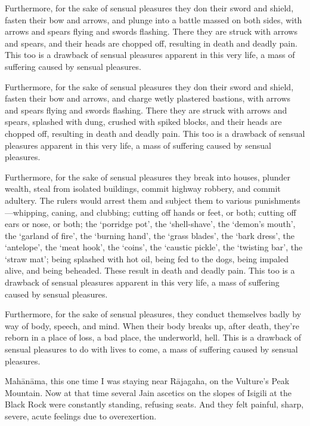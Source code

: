 \documentclass[12pt,openany]{book}%
\begin{document}
Furthermore, for the sake of sensual pleasures they don their sword and shield, fasten their bow and arrows, and plunge into a battle massed on both sides, with arrows and spears flying and swords flashing. There they are struck with arrows and spears, and their heads are chopped off, resulting in death and deadly pain. This too is a drawback of sensual pleasures apparent in this very life, a mass of suffering caused by sensual pleasures. 

Furthermore, for the sake of sensual pleasures they don their sword and shield, fasten their bow and arrows, and charge wetly plastered bastions, with arrows and spears flying and swords flashing. There they are struck with arrows and spears, splashed with dung, crushed with spiked blocks, and their heads are chopped off, resulting in death and deadly pain. This too is a drawback of sensual pleasures apparent in this very life, a mass of suffering caused by sensual pleasures. 

Furthermore, for the sake of sensual pleasures they break into houses, plunder wealth, steal from isolated buildings, commit highway robbery, and commit adultery. The rulers would arrest them and subject them to various punishments—whipping, caning, and clubbing; cutting off hands or feet, or both; cutting off ears or nose, or both; the ‘porridge pot’, the ‘shell-shave’, the ‘demon’s mouth’, the ‘garland of fire’, the ‘burning hand’, the ‘grass blades’, the ‘bark dress’, the ‘antelope’, the ‘meat hook’, the ‘coins’, the ‘caustic pickle’, the ‘twisting bar’, the ‘straw mat’; being splashed with hot oil, being fed to the dogs, being impaled alive, and being beheaded. These result in death and deadly pain. This too is a drawback of sensual pleasures apparent in this very life, a mass of suffering caused by sensual pleasures. 

Furthermore, for the sake of sensual pleasures, they conduct themselves badly by way of body, speech, and mind. When their body breaks up, after death, they’re reborn in a place of loss, a bad place, the underworld, hell. This is a drawback of sensual pleasures to do with lives to come, a mass of suffering caused by sensual pleasures. 

\textsanskrit{Mahānāma}, this one time I was staying near \textsanskrit{Rājagaha}, on the Vulture’s Peak Mountain. Now at that time several Jain ascetics on the slopes of Isigili at the Black Rock were constantly standing, refusing seats. And they felt painful, sharp, severe, acute feelings due to overexertion. 
\end{document}

